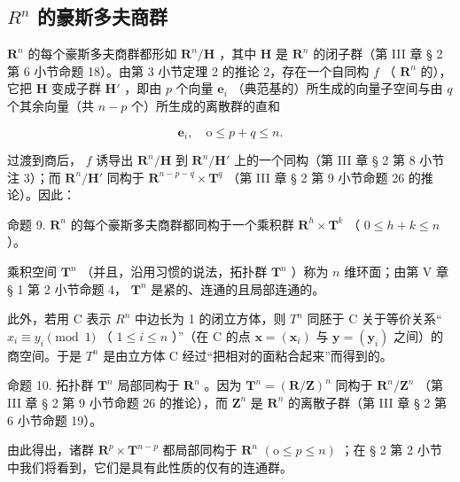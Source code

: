 \subsection{\texorpdfstring{\(R^{n}\) 的豪斯多夫商群}{R 的 n 次幂的豪斯多夫商群}}

\(\mathbf{R}^n\) 的每个豪斯多夫商群都形如 \(\mathbf{R}^n/\mathbf{H}\) ，其中 \(\mathbf{H}\) 是 \(\mathbf{R}^n\) 的闭子群（第 III 章 § 2 第 6 小节命题 18）。由第 3 小节定理 2 的推论 2，存在一个自同构 \(f\) （ \(\mathbf{R}^n\) 的），它把 \(\mathbf{H}\) 变成子群 \(\mathbf{H}'\) ，即由 \(p\) 个向量 \(\boldsymbol{e}_i\) （典范基的）所生成的向量子空间与由 \(q\) 个其余向量（共 \(n-p\) 个）所生成的离散群的直和

\[
\boldsymbol {e} _ {i}, \quad \mathrm{o} \leqslant p + q \leqslant n.
\]

过渡到商后， \(f\) 诱导出 \(\mathbf{R}^n / \mathbf{H}\) 到 \(\mathbf{R}^n / \mathbf{H}'\) 上的一个同构（第 III 章 § 2 第 8 小节注 3）；而 \(\mathbf{R}^n / \mathbf{H}'\) 同构于 \(\mathbf{R}^{n - p - q} \times \mathbf{T}^q\) （第 III 章 § 2 第 9 小节命题 26 的推论）。因此：

命题 9. \(\mathbf{R}^{n}\) 的每个豪斯多夫商群都同构于一个乘积群 \(\mathbf{R}^{h} \times \mathbf{T}^{k}\) （ \(0 \leqslant h + k \leqslant n\) ）。

乘积空间 \(\mathbf{T}^n\) （并且，沿用习惯的说法，拓扑群 \(\mathbf{T}^n\) ）称为 \(n\) 维环面；由第 V 章 § 1 第 2 小节命题 4， \(\mathbf{T}^n\) 是紧的、连通的且局部连通的。

此外，若用 C 表示 \(R^{n}\) 中边长为 1 的闭立方体，则 \(T^{n}\) 同胚于 C 关于等价关系`` \(x_{i} \equiv y_{i} \pmod{1}\) （ \(1 \leqslant i \leqslant n\) ）''（在 C 的点 \(\boldsymbol{x} = (\boldsymbol{x}_{i})\) 与 \(\boldsymbol{y} = (\boldsymbol{y}_{i})\) 之间）的商空间。于是 \(T^{n}\) 是由立方体 C 经过“把相对的面粘合起来”而得到的。

命题 10. 拓扑群 \(\mathbf{T}^n\) 局部同构于 \(\mathbf{R}^n\) 。因为 \(\mathbf{T}^n = (\mathbf{R}/\mathbf{Z})^n\) 同构于 \(\mathbf{R}^n/\mathbf{Z}^n\) （第 III 章 § 2 第 9 小节命题 26 的推论），而 \(\mathbf{Z}^n\) 是 \(\mathbf{R}^n\) 的离散子群（第 III 章 § 2 第 6 小节命题 19）。

由此得出，诸群 \(\mathbf{R}^p\times \mathbf{T}^{n - p}\) 都局部同构于 \(\mathbf{R}^n\) \((\mathrm{o}\leqslant p\leqslant n)\) ；在 § 2 第 2 小节中我们将看到，它们是具有此性质的仅有的连通群。

